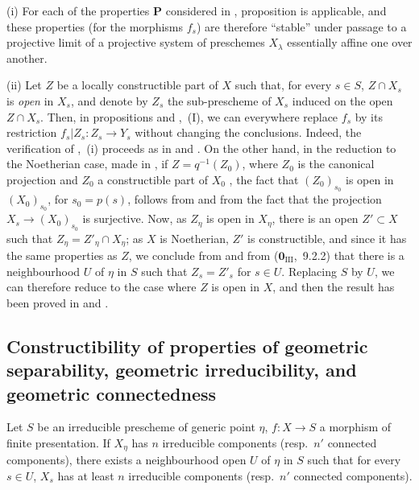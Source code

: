 \begin{remarks}[9.6.7]
\label{IV.9.6.7}
(i) For each of the properties $\mathbf{P}$ considered in , proposition  is applicable, and these properties (for the morphisms $f_s$) are therefore ``stable'' under passage to a projective limit of a projective system of preschemes $X_\lambda$ essentially affine  one over another.

(ii) Let $Z$ be a locally constructible part of $X$ such that, for every $s\in S$, $Z\cap X_s$ is \emph{open} in $X_s$, and denote by $Z_s$ the sub-prescheme of $X_s$ induced on the open $Z\cap X_s$.
Then, in propositions  and ,~(I), we can everywhere replace $f_s$ by its restriction $f_s|Z_s:Z_s\to Y_s$ without changing the conclusions.
Indeed, the verification of ,~(i) proceeds as in  and .
On the other hand, in the reduction to the Noetherian case, made in , if $Z=q^{-1}(Z_0)$, where $Z_0$ is the canonical projection and $Z_0$ a constructible part of $X_0$ , the fact that $(Z_0)_{s_0}$ is open in $(X_0)_{s_0}$, for $s_0=p(s)$, follows from  and from the fact that the projection $X_s\to(X_0)_{s_0}$ is surjective.
Now, as $Z_\eta$ is open in $X_\eta$, there is an open $Z'\subset X$ such that $Z_\eta=Z'_\eta\cap X_\eta$; as $X$ is Noetherian, $Z'$ is constructible, and since it has the same properties as $Z$, we conclude from  and from ($\mathbf{0}_{\mathrm{III}}$,~9.2.2) that there is a neighbourhood $U$ of $\eta$ in $S$ such that $Z_s=Z'_s$ for $s\in U$.
Replacing $S$ by $U$, we can therefore reduce to the case where $Z$ is open in $X$, and then the result has been proved in  and .
\end{remarks}

\subsection{Constructibility of properties of geometric separability, geometric irreducibility, and geometric connectedness}
\label{subsection:IV.9.7}
\label{IV.9.7}

\begin{lemma}[9.7.1]
\label{IV.9.7.1}
Let $S$ be an irreducible prescheme of generic point $\eta$, $f:X\to S$ a morphism of finite presentation.
If $X_\eta$ has $n$ irreducible components (resp.\ $n'$ connected components), there exists a neighbourhood open $U$ of $\eta$ in $S$ such that for every $s\in U$, $X_s$ has at least $n$ irreducible components (resp.\ $n'$ connected components).
\end{lemma}

